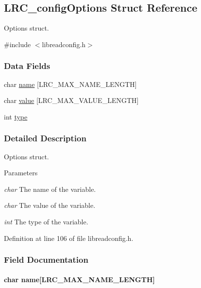 \hypertarget{struct_l_r_c__config_options}{
\subsection{LRC\_\-configOptions Struct Reference}
\label{struct_l_r_c__config_options}
}


Options struct.  


{\ttfamily \#include $<$libreadconfig.h$>$}\subsubsection*{Data Fields}
\begin{DoxyCompactItemize}
\item 
char \hyperlink{struct_l_r_c__config_options_a3905a5526840a813b7d9f98268d66ec8}{name} \mbox{[}LRC\_\-MAX\_\-NAME\_\-LENGTH\mbox{]}
\item 
char \hyperlink{struct_l_r_c__config_options_a643773f9f784c3c583c832c216ba32c9}{value} \mbox{[}LRC\_\-MAX\_\-VALUE\_\-LENGTH\mbox{]}
\item 
int \hyperlink{struct_l_r_c__config_options_ac765329451135abec74c45e1897abf26}{type}
\end{DoxyCompactItemize}


\subsubsection{Detailed Description}
Options struct. 
\begin{DoxyParams}{Parameters}
\item[{\em char}]The name of the variable.\item[{\em char}]The value of the variable.\item[{\em int}]The type of the variable. \end{DoxyParams}


Definition at line 106 of file libreadconfig.h.

\subsubsection{Field Documentation}
\hypertarget{struct_l_r_c__config_options_a3905a5526840a813b7d9f98268d66ec8}{
\paragraph[{name}]{\setlength{\rightskip}{0pt plus 5cm}char {\bf name}\mbox{[}LRC\_\-MAX\_\-NAME\_\-LENGTH\mbox{]}}\hfill}
\label{struct_l_r_c__config_options_a3905a5526840a813b7d9f98268d66ec8}


